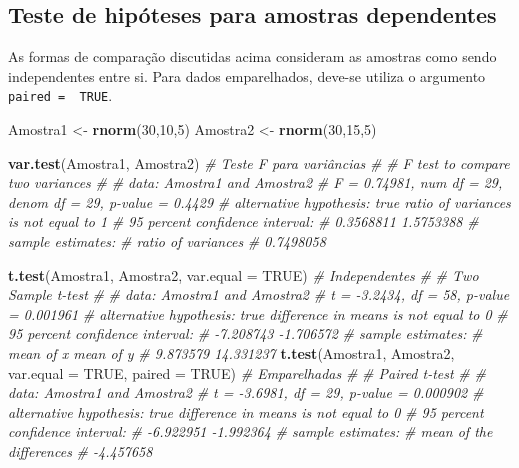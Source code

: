 \documentclass[
]{book}
\newenvironment{Shaded}{\begin{snugshade}}{\end{snugshade}}
\newcommand{\CommentTok}[1]{\textcolor[rgb]{0.56,0.35,0.01}{\textit{#1}}}
\newcommand{\DataTypeTok}[1]{\textcolor[rgb]{0.13,0.29,0.53}{#1}}
\newcommand{\DecValTok}[1]{\textcolor[rgb]{0.00,0.00,0.81}{#1}}
\newcommand{\KeywordTok}[1]{\textcolor[rgb]{0.13,0.29,0.53}{\textbf{#1}}}
\newcommand{\NormalTok}[1]{#1}
\newcommand{\OtherTok}[1]{\textcolor[rgb]{0.56,0.35,0.01}{#1}}
\newcommand{\StringTok}[1]{\textcolor[rgb]{0.31,0.60,0.02}{#1}}
\numberwithin{equation}{section}
\begin{document}
\hypertarget{teste-de-hipuxf3teses-para-amostras-dependentes}{%
\subsection{Teste de hipóteses para amostras dependentes}\label{teste-de-hipuxf3teses-para-amostras-dependentes}}

As formas de comparação discutidas acima consideram as amostras como sendo independentes entre si. Para dados emparelhados, deve-se utiliza o argumento \texttt{paired\ =\ \ TRUE}.

\begin{Shaded}
\begin{Highlighting}[]
\NormalTok{Amostra1 \textless{}{-}}\StringTok{ }\KeywordTok{rnorm}\NormalTok{(}\DecValTok{30}\NormalTok{,}\DecValTok{10}\NormalTok{,}\DecValTok{5}\NormalTok{)}
\NormalTok{Amostra2 \textless{}{-}}\StringTok{ }\KeywordTok{rnorm}\NormalTok{(}\DecValTok{30}\NormalTok{,}\DecValTok{15}\NormalTok{,}\DecValTok{5}\NormalTok{)}

\KeywordTok{var.test}\NormalTok{(Amostra1, Amostra2) }\CommentTok{\# Teste F para variâncias}
\CommentTok{\# }
\CommentTok{\#   F test to compare two variances}
\CommentTok{\# }
\CommentTok{\# data:  Amostra1 and Amostra2}
\CommentTok{\# F = 0.74981, num df = 29, denom df = 29, p{-}value = 0.4429}
\CommentTok{\# alternative hypothesis: true ratio of variances is not equal to 1}
\CommentTok{\# 95 percent confidence interval:}
\CommentTok{\#  0.3568811 1.5753388}
\CommentTok{\# sample estimates:}
\CommentTok{\# ratio of variances }
\CommentTok{\#          0.7498058}

\KeywordTok{t.test}\NormalTok{(Amostra1, Amostra2, }\DataTypeTok{var.equal =} \OtherTok{TRUE}\NormalTok{) }\CommentTok{\# Independentes}
\CommentTok{\# }
\CommentTok{\#   Two Sample t{-}test}
\CommentTok{\# }
\CommentTok{\# data:  Amostra1 and Amostra2}
\CommentTok{\# t = {-}3.2434, df = 58, p{-}value = 0.001961}
\CommentTok{\# alternative hypothesis: true difference in means is not equal to 0}
\CommentTok{\# 95 percent confidence interval:}
\CommentTok{\#  {-}7.208743 {-}1.706572}
\CommentTok{\# sample estimates:}
\CommentTok{\# mean of x mean of y }
\CommentTok{\#  9.873579 14.331237}
\KeywordTok{t.test}\NormalTok{(Amostra1, Amostra2, }\DataTypeTok{var.equal =} \OtherTok{TRUE}\NormalTok{, }\DataTypeTok{paired =} \OtherTok{TRUE}\NormalTok{) }\CommentTok{\# Emparelhadas}
\CommentTok{\# }
\CommentTok{\#   Paired t{-}test}
\CommentTok{\# }
\CommentTok{\# data:  Amostra1 and Amostra2}
\CommentTok{\# t = {-}3.6981, df = 29, p{-}value = 0.000902}
\CommentTok{\# alternative hypothesis: true difference in means is not equal to 0}
\CommentTok{\# 95 percent confidence interval:}
\CommentTok{\#  {-}6.922951 {-}1.992364}
\CommentTok{\# sample estimates:}
\CommentTok{\# mean of the differences }
\CommentTok{\#               {-}4.457658}
\end{Highlighting}
\end{Shaded}
\end{document}
